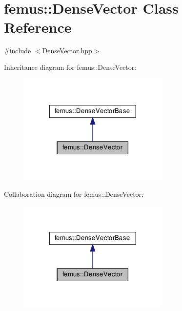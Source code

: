 \hypertarget{classfemus_1_1_dense_vector}{}\section{femus\+:\+:Dense\+Vector Class Reference}
\label{classfemus_1_1_dense_vector}


{\ttfamily \#include $<$Dense\+Vector.\+hpp$>$}



Inheritance diagram for femus\+:\+:Dense\+Vector\+:
\nopagebreak
\begin{figure}[H]
\begin{center}
\leavevmode
\includegraphics[width=213pt]{classfemus_1_1_dense_vector__inherit__graph}
\end{center}
\end{figure}


Collaboration diagram for femus\+:\+:Dense\+Vector\+:
\nopagebreak
\begin{figure}[H]
\begin{center}
\leavevmode
\includegraphics[width=213pt]{classfemus_1_1_dense_vector__coll__graph}
\end{center}
\end{figure}
